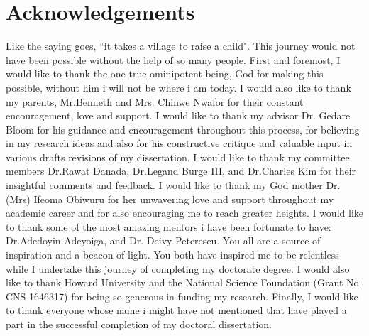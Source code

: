 

\chapter*{Acknowledgements}

Like the saying goes, ``it takes a village to raise a child". This journey would not have been possible without the help of so many people. First and foremost, I would like to thank the one true ominipotent being, God for making this possible, without him i will not be where i am today. I would also like to thank my parents, Mr.Benneth and Mrs. Chinwe Nwafor for their constant encouragement, love and support. I would like to thank my advisor Dr. Gedare Bloom for his guidance and encouragement throughout this process, for believing in my research ideas and also for his constructive critique and valuable input in various drafts revisions of my dissertation. I would like to thank my committee members Dr.Rawat Danada, Dr.Legand Burge III, and Dr.Charles Kim for their insightful comments and feedback. I would like to thank my God mother Dr.(Mrs) Ifeoma Obiwuru for her unwavering love and support throughout my academic career and for also encouraging me to reach greater heights. I would like to thank some of the most amazing mentors i have been fortunate to have: Dr.Adedoyin Adeyoiga, and Dr. Deivy Peterescu. You all are a source of inspiration and a beacon of light. You both have inspired me to be relentless while I undertake this journey of completing my doctorate degree. I would also like to thank Howard University and the National Science
Foundation (Grant No. CNS-1646317) for being so generous in funding my research. Finally, I would like to thank everyone whose name i might have not mentioned that have played a part in the successful completion of my doctoral dissertation. 




